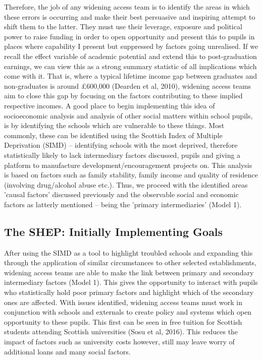 \documentclass[11pt, english]{article}
\begin{document}
	Therefore, the job of any widening access team is to identify the areas in which these errors is occurring and make their best persuasive and inspiring attempt to shift them to the latter. They must use their leverage, exposure and political power to raise funding in order to open opportunity and present this to pupils in places where capability I present but suppressed by factors going unrealised. If we recall the effect variable of academic potential and extend this to post-graduation earnings, we can view this as a strong summary statistic of all implications which come with it. That is, where a typical lifetime income gap between graduates and non-graduates is around £600,000  (Dearden et al, 2010), widening access teams aim to close this gap by focusing on the factors contributing to these implied respective incomes. A good place to begin implementing this idea of socioeconomic analysis and analysis of other social matters within school pupils, is by identifying the schools which are vulnerable to these things. Most commonly, these can be identified using the Scottish Index of Multiple Deprivation (SIMD) – identifying schools with the most deprived, therefore statistically likely to lack intermediary factors discussed, pupils and giving a platform to manufacture development/encouragement projects on. This analysis is based on factors such as family stability, family income and quality of residence (involving drug/alcohol abuse etc.). Thus, we proceed with the identified areas 'causal factors' discussed previously and the observable social and economic factors as latterly mentioned – being the 'primary intermediaries' (Model 1).

	\subsection{The SHEP: Initially Implementing Goals}

	After using the SIMD as a tool to highlight troubled schools and expanding this through the application of similar circumstances to other selected establishments, widening access teams are able to make the link between primary and secondary intermediary factors (Model 1). This gives the opportunity to interact with pupils who statistically hold poor primary factors and highlight which of the secondary ones are affected. With issues identified, widening access teams must work in conjunction with schools and externals to create policy and systems which open opportunity to these pupils. This first can be seen in free tuition for Scottish students attending Scottish universities (Sosu et al, 2016). This reduces the impact of factors such as university costs however, still may leave worry of additional loans and many social factors.\\
\end{document}
